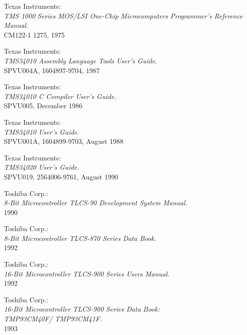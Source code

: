  Texas Instruments: \\
                     {\em TMS 1000 Series MOS/LSI One-Chip
                     Microcomputers Programmer's Reference
                     Manual.\/} \\
                     CM122-1 1275, 1975

 Texas Instruments: \\
                     {\em TMS34010 Assembly Language Tools User's Guide.\/} \\
                     SPVU004A, 1604897-9704, 1987

 Texas Instruments: \\
                     {\em TMS34010 C Compiler User's Guide.\/} \\
                     SPVU005, December 1986

 Texas Instruments: \\
                     {\em TMS34010 User's Guide.\/} \\
                     SPVU001A, 1604899-9703, August 1988

 Texas Instruments: \\
                     {\em TMS34020 User's Guide.\/} \\
                     SPVU019, 2564006-9761, August 1990

 Toshiba Corp.: \\
                 {\em 8-Bit Microcontroller TLCS-90 Development System
                 Manual.\/} \\
                 1990

 Toshiba Corp.: \\
                  {\em 8-Bit Microcontroller TLCS-870 Series Data
                  Book.\/} \\
                  1992

 Toshiba Corp.: \\
                  {\em 16-Bit Microcontroller TLCS-900 Series Users
                  Manual.\/} \\
                  1992

 Toshiba Corp.: \\
                   {\em 16-Bit Microcontroller TLCS-900 Series Data Book: \\
                    TMP93CM40F/ TMP93CM41F.\/} \\
                   1993

